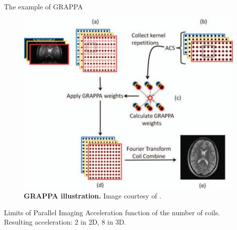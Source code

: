 \begin{frame}{The example of GRAPPA}
    \begin{figure}
        \centering
        \includegraphics[height=0.6\textheight]{Figures/intro_figures/GRAPPA.jpeg}
        \caption{\label{fig:GRAPPA}\textbf{GRAPPA illustration.} Image courtesy of \citet{deshmane2012parallel}.
        }
    \end{figure} 
\end{frame}

\begin{frame}{Limits of Parallel Imaging}
    Acceleration function of the number of coils.\\
    Resulting acceleration: 2 in 2D, 8 in 3D.
\end{frame}